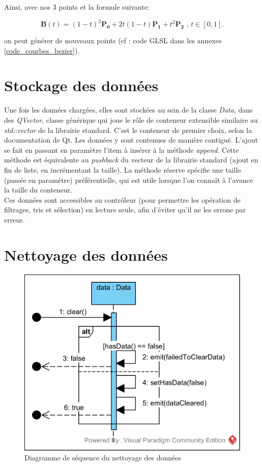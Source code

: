 \documentclass[12pt]{article}
\begin{document}
		Ainsi, avec nos 3 points et la formule suivante:
		
		\[
			{\mathbf  {B}}(t)=(1-t)^{{2}}{\mathbf  {P_{0}}}+2t(1-t){\mathbf  {P_{1}}}+t^{{2}}{\mathbf  {P_{2}}}{\mbox{ , }}t\in [0,1].
		\]
		
		on peut générer de nouveaux points (cf : code GLSL dans les annexes \ref{code_courbes_bezier}).
	
	\newpage
	\section{Stockage des données}
	Une fois les données chargées, elles sont stockées au sein de la classe \textit{Data}, dans des \textit{QVector}, classe générique qui joue le rôle de conteneur extensible similaire au \textit{std::vector} de la librairie standard. C’est le conteneur de premier choix, selon la documentation de Qt.
Les données y sont contenues de manière contiguë. L’ajout se fait en passant en paramètre l’item à insérer à la méthode \textit{append}. Cette méthode est équivalente au \textit{pushback} du vecteur de la librairie standard (ajout en fin de liste, en incrémentant la taille). La méthode réserve spécifie une taille (passée en paramètre) préférentielle, qui est utile lorsque l’on connaît à l’avance la taille du conteneur.\\

	Ces données sont accessibles au contrôleur (pour permettre les opération de filtrages, tris et sélection) en lecture seule, afin d’éviter qu’il ne les errone par erreur.\\

	\newpage
	\section{Nettoyage des données}
	\begin{figure}[!h]
	\begin{center}
	\includegraphics[scale=1]{dia_sequence_clear.png}
	\caption{ Diagramme de séquence du nettoyage des données}
	\label{fig:nettoyage}
	\end{center}
	\end{figure}
	
\end{document}
